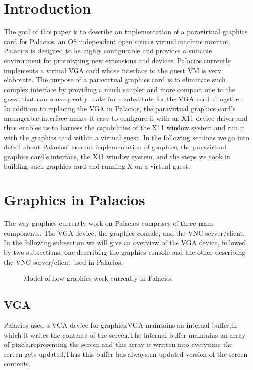 \documentclass{acm_proc_article-sp}
\begin{document}
\section{Introduction}
The goal of this paper is to describe an implementation of a paravirtual
graphics card for Palacios, an OS independent open source virtual machine
monitor. \cite{Lange: Technical} Palacios is designed to be 
highly configurable and provides a suitable environment
for prototyping new extensions and devices. Palacios currently implements
a virtual VGA card whose interface to the guest VM is very elaborate. The
purpose of a paravirtual graphics card is to eliminate such complex interface
by providing a much simpler and more compact one to the guest that can
consequently make for a substitute for the VGA card altogether. In addition to
replacing the VGA in Palacios, the paravirtual graphics card's manageable
interface makes it easy to configure it with an X11 device driver and thus
enables us to harness the capabilities of the X11 window system and run it with the
graphics card within a virtual guest. In the following sections we go into
detail about Palacios' current implementation of graphics, the paravirtual
graphics card's interface, the X11 window system, and the steps we took in
 building such graphics card and running X on a virtual guest.

\section{Graphics in Palacios}
The way graphics currently work on Palacios comprises of three main components.
The VGA device, the graphics console, and the VNC server/client. In the
following subsection we will give an overview of the VGA device, followed by two
subsections, one describing the graphics console and the other describing the
VNC server/client used in Palacios.
\begin{figure}[h]                                              
\centering                                                 
{}                                      
\caption{Model of how graphics work currently in Palacios}   
\end{figure}                                               

\subsection{VGA}
Palacios used a VGA device for graphics.VGA maintains an internal buffer,in which it writes the contents of the screen.The internal buffer maintains an array of pixels,representing the screen and this array is written into everytime the screen gets updated,Thus this buffer has always,an updated version of the screen contents.
\end{document}

